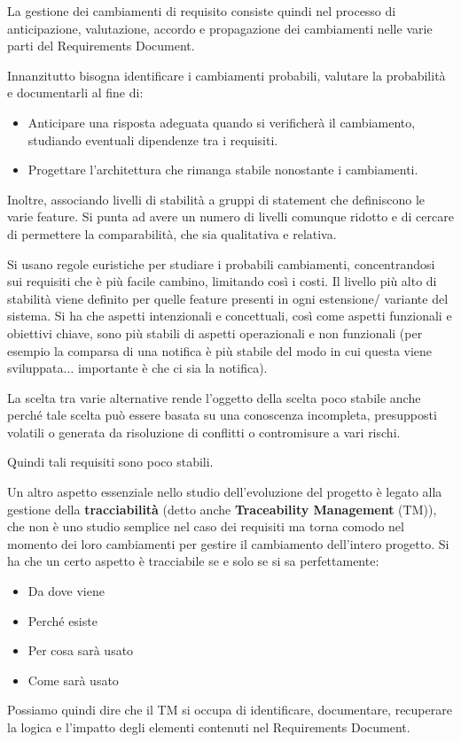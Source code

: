 La gestione dei cambiamenti di requisito consiste quindi nel processo di anticipazione, valutazione, accordo e propagazione dei cambiamenti nelle varie parti del Requirements Document.

Innanzitutto bisogna identificare i cambiamenti probabili, valutare la probabilità e documentarli al fine di:
\begin{itemize}
    \item Anticipare una risposta adeguata quando si verificherà il cambiamento, studiando eventuali dipendenze tra i requisiti.
    \item Progettare l'architettura che rimanga stabile nonostante i cambiamenti.
\end{itemize}
Inoltre, associando livelli di stabilità a gruppi di statement che definiscono le varie feature. Si punta ad avere un numero di livelli comunque ridotto e di cercare di permettere la comparabilità, che sia qualitativa e relativa.

Si usano regole euristiche per studiare i probabili cambiamenti, concentrandosi sui requisiti che è più facile cambino, limitando così i costi. Il livello più alto di stabilità viene definito per quelle feature presenti in ogni estensione/ variante del sistema. Si ha che aspetti intenzionali e concettuali, così come aspetti funzionali e obiettivi chiave, sono più stabili di aspetti operazionali e non funzionali (per esempio la comparsa di una notifica è più stabile del modo in cui questa viene sviluppata$\dots$ importante è che ci sia la notifica).

La scelta tra varie alternative rende l'oggetto della scelta poco stabile anche perché tale scelta può essere basata su una conoscenza incompleta, presupposti volatili o generata da risoluzione di conflitti o contromisure a vari rischi.

Quindi tali requisiti sono poco stabili.

Un altro aspetto essenziale nello studio dell'evoluzione del progetto è legato alla gestione della \textbf{tracciabilità} (detto anche \textbf{Traceability Management} (TM)), che non è uno studio semplice nel caso dei requisiti ma torna comodo nel momento dei loro cambiamenti per gestire il cambiamento dell'intero progetto. Si ha che un certo aspetto è tracciabile se e solo se si sa perfettamente:
\begin{itemize}
    \item Da dove viene
    \item Perché esiste
    \item Per cosa sarà usato
    \item Come sarà usato
\end{itemize}
Possiamo quindi dire che il TM si occupa di identificare, documentare, recuperare la logica e l'impatto degli elementi contenuti nel Requirements Document.


